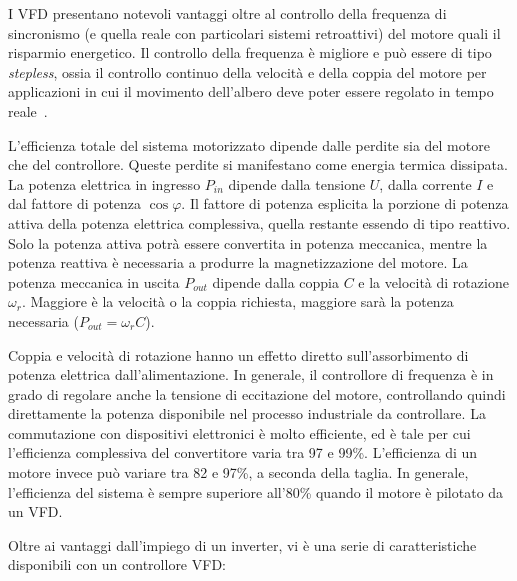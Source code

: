 I VFD presentano notevoli vantaggi oltre al controllo della frequenza di sincronismo (e quella reale con particolari sistemi retroattivi) del motore quali il risparmio energetico. Il controllo della frequenza è migliore e può essere di tipo \textit{stepless}, ossia il controllo continuo della velocità e della coppia del motore per applicazioni in cui il movimento dell'albero deve poter essere regolato in tempo reale~\cite{kureck2009}.

L'efficienza totale del sistema motorizzato dipende dalle perdite sia del motore che del controllore. Queste perdite si manifestano come energia termica dissipata. La potenza elettrica in ingresso $P_{in}$ dipende dalla tensione $U$, dalla corrente $I$ e dal fattore di potenza $\cos\varphi$. Il fattore di potenza esplicita la porzione di potenza attiva della potenza elettrica complessiva, quella restante essendo di tipo reattivo. Solo la potenza attiva potrà essere convertita in potenza meccanica, mentre la potenza reattiva è necessaria a produrre la magnetizzazione del motore. La potenza meccanica in uscita $P_{out}$ dipende dalla coppia $C$ e la velocità di rotazione $\omega_r$. Maggiore è la velocità o la coppia richiesta, maggiore sarà la potenza necessaria ($P_{out} = \omega_r C$).

Coppia e velocità di rotazione hanno un effetto diretto sull'assorbimento di potenza elettrica dall'alimentazione. In generale, il controllore di frequenza è in grado di regolare anche la tensione di eccitazione del motore, controllando quindi direttamente la potenza disponibile nel processo industriale da controllare. La commutazione con dispositivi elettronici è molto efficiente, ed è tale per cui l'efficienza complessiva del convertitore varia tra 97 e 99\%. L'efficienza di un motore invece può variare tra 82 e 97\%, a seconda della taglia. In generale, l'efficienza del sistema è sempre superiore all'80\% quando il motore è pilotato da un VFD.

Oltre ai vantaggi dall'impiego di un inverter, vi è una serie di caratteristiche disponibili con un controllore VFD:

